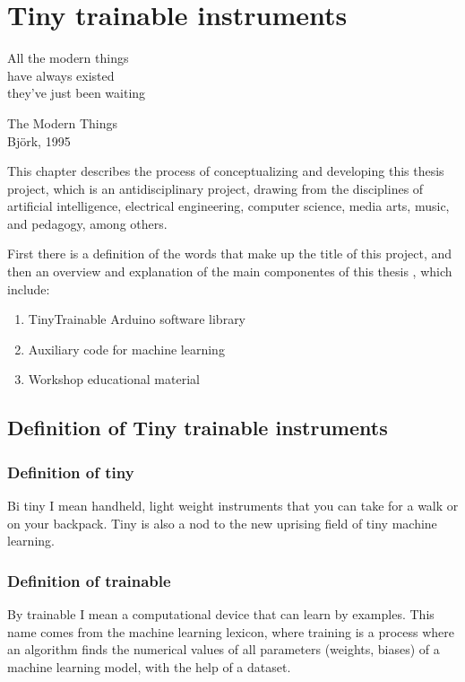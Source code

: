 \chapter{Tiny trainable instruments}

\epigraph{All the modern things \\ have always existed \\ they've just been waiting}{The Modern Things \\ Björk, 1995}

This chapter describes the process of conceptualizing and developing this thesis project, which is an antidisciplinary project, drawing from the disciplines of artificial intelligence, electrical engineering, computer science, media arts, music, and pedagogy, among others.

First there is a definition of the words that make up the title of this project, and then an overview and explanation of the main componentes of this thesis , which include:

\begin{enumerate}
  \item TinyTrainable Arduino software library
  \item Auxiliary code for machine learning
  \item Workshop educational material
\end{enumerate}

\section{Definition of Tiny trainable instruments}

\subsection{Definition of tiny}

Bi tiny I mean handheld, light weight instruments that you can take for a walk or on your backpack. Tiny is also a nod to the new uprising field of tiny machine learning.

\subsection{Definition of trainable}

By trainable I mean a computational device that can learn by examples. This name comes from the machine learning lexicon, where training is a process where an algorithm finds the numerical values of all parameters (weights, biases) of a machine learning model, with the help of a dataset.

